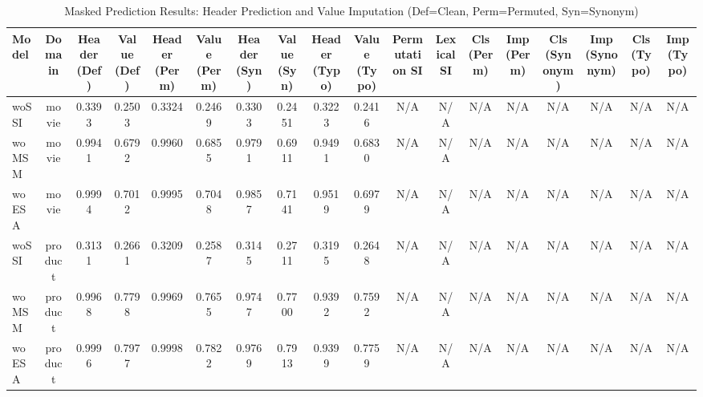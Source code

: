 \begin{table}
\centering
\begin{tabular}{lccccccccccccccccc}
\toprule
Model & Domain & Header (Def) & Value (Def) & Header (Perm) & Value (Perm) & Header (Syn) & Value (Syn) & Header (Typo) & Value (Typo) & Permutation SI & Lexical SI & Cls (Perm) & Imp (Perm) & Cls (Synonym) & Imp (Synonym) & Cls (Typo) & Imp (Typo) \\
\midrule
woSSI & movie & 0.3393 & 0.2503 & 0.3324 & 0.2469 & 0.3303 & 0.2451 & 0.3223 & 0.2416 & N/A & N/A & N/A & N/A & N/A & N/A & N/A & N/A \\
woMSM & movie & 0.9941 & 0.6792 & 0.9960 & 0.6855 & 0.9791 & 0.6911 & 0.9491 & 0.6830 & N/A & N/A & N/A & N/A & N/A & N/A & N/A & N/A \\
woESA & movie & 0.9994 & 0.7012 & 0.9995 & 0.7048 & 0.9857 & 0.7141 & 0.9519 & 0.6979 & N/A & N/A & N/A & N/A & N/A & N/A & N/A & N/A \\
woSSI & product & 0.3131 & 0.2661 & 0.3209 & 0.2587 & 0.3145 & 0.2711 & 0.3195 & 0.2648 & N/A & N/A & N/A & N/A & N/A & N/A & N/A & N/A \\
woMSM & product & 0.9968 & 0.7798 & 0.9969 & 0.7655 & 0.9747 & 0.7700 & 0.9392 & 0.7592 & N/A & N/A & N/A & N/A & N/A & N/A & N/A & N/A \\
woESA & product & 0.9996 & 0.7977 & 0.9998 & 0.7822 & 0.9769 & 0.7913 & 0.9399 & 0.7759 & N/A & N/A & N/A & N/A & N/A & N/A & N/A & N/A \\
\bottomrule
\end{tabular}
\caption{Masked Prediction Results: Header Prediction and Value Imputation (Def=Clean, Perm=Permuted, Syn=Synonym)}
\label{tab:masked_prediction}
\end{table}
